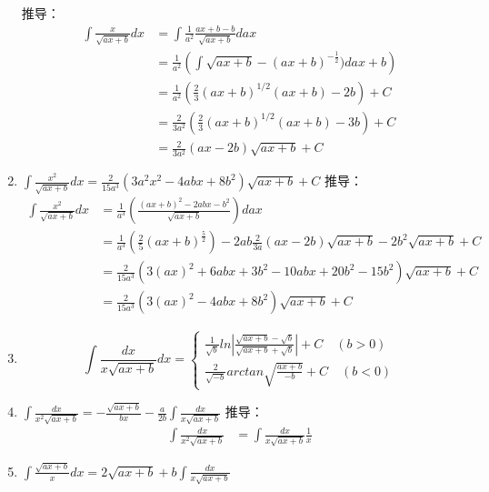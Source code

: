 \begin{enumerate}
	推导：
	\begin{equation}
		\begin{split}
			\int \frac{x}{\sqrt{ax+b}}dx &=\int \frac{1}{a^2}\frac{ax+b-b}{\sqrt{ax+b}}d{ax} \\ 
			&=\frac{1}{a^2}\left(\int \sqrt{ax+b}-(ax+b)^{-\frac{1}{2}})d{ax+b}\right) \\ 
			&=\frac{1}{a^2}\left(\frac{2}{3}(ax+b)^{1/2}(ax+b)-2b\right)+C \\ 
			&=\frac{2}{3a^2}\left(\frac{2}{3}(ax+b)^{1/2}(ax+b)-3b\right)+C \\ 
			&=\frac{2}{3a^2}(ax-2b)\sqrt{ax+b}+C
		\end{split}
	\end{equation}
	\item $\int \frac{x^2}{\sqrt{ax+b}}dx=\frac{2}{15a^3}(3a^2x^2-4abx+8b^2)\sqrt{ax+b}+C$
	推导：
	\begin{equation}
		\begin{split}
			\int \frac{x^2}{\sqrt{ax+b}}dx&=\frac{1}{a^3}(\frac{(ax+b)^2-2abx-b^2}{\sqrt{ax+b}})dax\\ 
			&=\frac{1}{a^3}\left(\frac{2}{5}\left(ax+b\right)^{\frac{5}{2}}\right)-2ab \frac{2}{3a}(ax-2b)\sqrt{ax+b}-2b^2\sqrt{ax+b}+C\\ 
			&=\frac{2}{15a^3}\left(3(ax)^2+6abx+3b^2-10abx+20b^2-15b^2\right)\sqrt{ax+b}+C\\ 
			&=\frac{2}{15a^3}\left(3(ax)^2-4abx+8b^2\right)\sqrt{ax+b}+C
		\end{split}
	\end{equation}
	\item \begin{equation}
		\int \frac{dx}{x\sqrt{ax+b}}dx=\begin{cases}
	\frac{1}{\sqrt{b}}ln|\frac{\sqrt{ax+b}-\sqrt{b}}{\sqrt{ax+b}+\sqrt{b}}|+C\quad (b>0)\\
	\frac{2}{\sqrt{-b}}arctan\sqrt{\frac{ax+b}{-b}}+C\quad (b<0)
	\end{cases}
\end{equation}
	\item $\int \frac{dx}{x^2\sqrt{ax+b}}=-\frac{\sqrt{ax+b}}{bx}-\frac{a}{2b}\int\frac{dx}{x\sqrt{ax+b}}$
	推导：
	\begin{equation}
		\begin{split}
			\int \frac{dx}{x^2\sqrt{ax+b}} &=\int \frac{dx}{x\sqrt{ax+b}}\frac{1}{x}
		\end{split}
	\end{equation}
	\item $\int \frac{\sqrt{ax+b}}{x}dx=2\sqrt{ax+b}+b\int\frac{dx}{x\sqrt{ax+b}}$

\end{enumerate}

